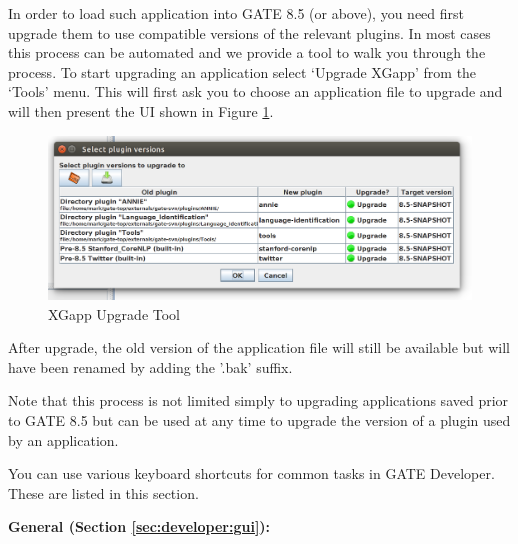 In order to load such application into GATE 8.5 (or above), you need first upgrade them to use compatible versions of the relevant plugins.
In most cases this process can be automated and we provide a tool to walk you through the process. To start upgrading an application select
`Upgrade XGapp' from the `Tools' menu. This will first ask you to choose an application file to upgrade and will then present the UI shown in
Figure \ref{fig:upgrade-tool}.

\begin{figure}[htb]
\begin{center}
\includegraphics[width=\textwidth]{upgrade-tool.png}
\end{center}
\caption{XGapp Upgrade Tool}
\label{fig:upgrade-tool}
\end{figure}



After upgrade, the old version of the application file will still be available but will have been renamed by adding the '.bak' suffix.

Note that this process is not limited simply to upgrading applications saved prior to GATE 8.5 but can be used at any time to upgrade
the version of a plugin used by an application.


You can use various keyboard shortcuts for common tasks in GATE Developer.
These are listed in this section.

{\bf General (Section \ref{sec:developer:gui}):}

